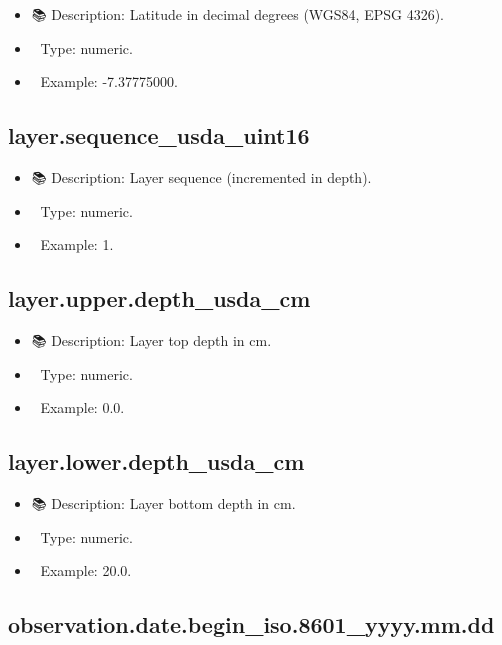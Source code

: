 \documentclass[
  letterpaper,
  DIV=11,
  numbers=noendperiod]{scrreprt}
\providecommand{\tightlist}{%
  \setlength{\itemsep}{0pt}\setlength{\parskip}{0pt}}\usepackage{longtable,booktabs,array}
\begin{document}
\begin{itemize}
\tightlist
\item
  📚 Description: Latitude in decimal degrees (WGS84, EPSG 4326).
\item
  🔢 Type: numeric.
\item
  📖 Example: -7.37775000.
\end{itemize}

\subsection{layer.sequence\_usda\_uint16}\label{layer.sequence_usda_uint16}

\begin{itemize}
\tightlist
\item
  📚 Description: Layer sequence (incremented in depth).
\item
  🔢 Type: numeric.
\item
  📖 Example: 1.
\end{itemize}

\subsection{layer.upper.depth\_usda\_cm}\label{layer.upper.depth_usda_cm}

\begin{itemize}
\tightlist
\item
  📚 Description: Layer top depth in cm.
\item
  🔢 Type: numeric.
\item
  📖 Example: 0.0.
\end{itemize}

\subsection{layer.lower.depth\_usda\_cm}\label{layer.lower.depth_usda_cm}

\begin{itemize}
\tightlist
\item
  📚 Description: Layer bottom depth in cm.
\item
  🔢 Type: numeric.
\item
  📖 Example: 20.0.
\end{itemize}

\subsection{observation.date.begin\_iso.8601\_yyyy.mm.dd}\label{observation.date.begin_iso.8601_yyyy.mm.dd}
\end{document}
